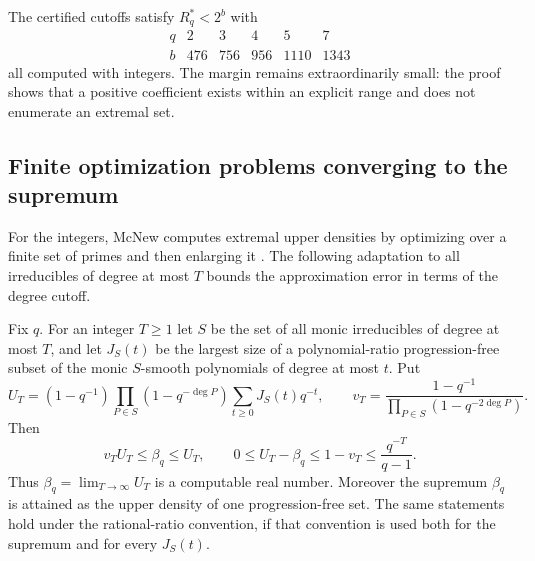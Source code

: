 The certified cutoffs satisfy $R_q^*<2^{b}$ with
\[
\begin{array}{c|ccccc}
 q&2&3&4&5&7\\\hline
 b&476&756&956&1110&1343
\end{array}
\]
all computed with integers. The margin remains extraordinarily small: the proof shows
that a positive coefficient exists within an explicit range and does not enumerate an
extremal set.

\subsection{Finite optimization problems converging to the supremum}\label{gpp:sec:supremum}
{\raggedright{}}

For the integers, McNew computes extremal upper densities by optimizing over a finite set
of primes and then enlarging it \cite[Theorems~4.2 and~5.1]{McNew2015Sets}. The following
adaptation to all irreducibles of degree at most $T$ bounds the approximation error in
terms of the degree cutoff.

\begin{theorem}\label{gpp:thm:supremum}
Fix $q$. For an integer $T\ge1$ let $S$ be the set of all monic irreducibles of degree at
most $T$, and let $J_S(t)$ be the largest size of a polynomial-ratio progression-free
subset of the monic $S$-smooth polynomials of degree at most $t$. Put
\[
 U_T=(1-q^{-1})\prod_{P\in S}(1-q^{-\deg P})\sum_{t\ge0}J_S(t)q^{-t},\qquad
 v_T=\frac{1-q^{-1}}{\prod_{P\in S}(1-q^{-2\deg P})}.
\]
Then
\[
 v_TU_T\le\beta_q\le U_T,\qquad
 0\le U_T-\beta_q\le1-v_T\le\frac{q^{-T}}{q-1}.
\]
Thus $\beta_q=\lim_{T\to\infty}U_T$ is a computable real number. Moreover the supremum
$\beta_q$ is attained as the upper density of one progression-free set. The same
statements hold under the rational-ratio convention, if that convention is used both for
the supremum and for every $J_S(t)$.
\end{theorem}

